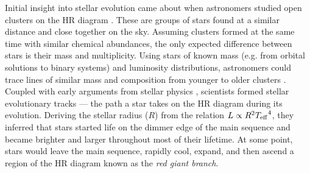 Initial insight into stellar evolution came about when astronomers studied open clusters on the HR diagram \citep{Trumpler1930}. These are groups of stars found at a similar distance and close together on the sky. Assuming clusters formed at the same time with similar chemical abundances, the only expected difference between stars is their mass and multiplicity. Using stars of known mass (e.g. from orbital solutions to binary systems) and luminosity distributions, astronomers could trace lines of similar mass and composition from younger to older clusters \citep[e.g.][]{Sandage1957}. Coupled with early arguments from stellar physics \citep[e.g.][]{Chandrasekhar1939}, scientists formed stellar evolutionary tracks --- the path a star takes on the HR diagram during its evolution. Deriving the stellar radius (\(R\)) from the relation \(L \propto R^2 {T_\mathrm{eff}}^4\), they inferred that stars started life on the dimmer edge of the main sequence and became brighter and larger throughout most of their lifetime. At some point, stars would leave the main sequence, rapidly cool, expand, and then ascend a region of the HR diagram known as the \emph{red giant branch}.





